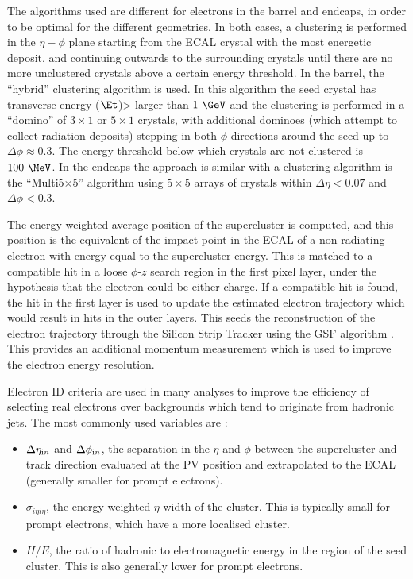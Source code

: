 The algorithms used are different for electrons in the barrel and endcaps, in
order to be optimal for the different geometries. In both cases, a clustering is performed
in the $\eta-\phi$ plane starting from the \ac{ECAL} crystal with the most energetic deposit, and
continuing outwards to the surrounding crystals until there are no more
unclustered crystals above a certain energy threshold. In the barrel, the
``hybrid'' clustering algorithm is used. In this algorithm the seed crystal
has transverse energy ($\Et$)> larger than $1~\GeV$ and the clustering is performed in a ``domino'' of $3\times1$ or
$5\times1$ crystals, with additional dominoes (which attempt to collect
radiation deposits) stepping in both $\phi$
directions around the seed up to $\Delta\phi\approx0.3$. The energy threshold
below which crystals are not clustered  is $100~\MeV$. In the endcaps the
approach is similar with a clustering algorithm
is the ``Multi5$\times$5'' algorithm using $5\times5$ arrays of crystals within
$\Delta\eta<0.07$ and $\Delta\phi<0.3$.

The energy-weighted average position of the supercluster is computed, and this
position is the equivalent of the impact point in the \ac{ECAL} of a
non-radiating electron with energy equal to the supercluster energy. This is
matched to a compatible hit in a loose $\phi$-$z$ search region 
in the first pixel layer, under the
hypothesis that the electron could be either charge. If a compatible hit is
found, the hit in the first layer is used to update the estimated electron
trajectory which would result in hits in the outer layers. This seeds the
reconstruction of the electron trajectory through the Silicon Strip Tracker
using the \ac{GSF} algorithm \cite{GSFalgorithm}. This provides an additional momentum measurement
which is used to improve the electron energy resolution. 

Electron ID criteria are used in many analyses to improve the efficiency of
selecting real electrons over backgrounds which tend to originate from
hadronic jets. The most commonly used variables are \cite{Baffioni:2006cd}:

\begin{itemize}
\item $\Delta\eta_{\text in}$ and $\Delta\phi_{\text in}$, the separation in the
$\eta$ and $\phi$ between the supercluster and track direction
evaluated at the \ac{PV} position and extrapolated to the \ac{ECAL} (generally
smaller for prompt electrons).
\item $\sigma_{i\eta i\eta}$, the energy-weighted $\eta$ width of the cluster.
This is typically small for prompt electrons, which have a more localised
cluster.
\item $H/E$, the ratio of hadronic to electromagnetic energy in the region of
the seed cluster. This is also generally lower for prompt electrons.
\end{itemize}

